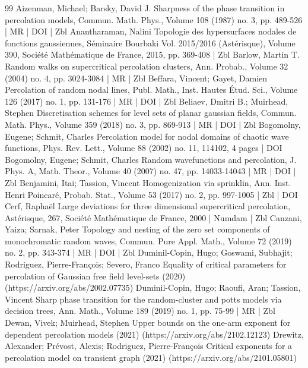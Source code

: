 \begin{thebibliography}{99}
Aizenman, Michael; Barsky, David J. Sharpness of the phase transition in percolation models, Commun. Math. Phys., Volume 108 (1987) no. 3, pp. 489-526 | MR | DOI | Zbl
Anantharaman, Nalini Topologie des hypersurfaces nodales de fonctions gaussiennes, Séminaire Bourbaki Vol. 2015/2016 (Astérisque), Volume 390, Société Mathématique de France, 2015, pp. 369-408 | Zbl
Barlow, Martin T. Random walks on supercritical percolation clusters, Ann. Probab., Volume 32 (2004) no. 4, pp. 3024-3084 | MR | Zbl
Beffara, Vincent; Gayet, Damien Percolation of random nodal lines, Publ. Math., Inst. Hautes Étud. Sci., Volume 126 (2017) no. 1, pp. 131-176 | MR | DOI | Zbl
Beliaev, Dmitri B.; Muirhead, Stephen Discretisation schemes for level sets of planar gaussian fields, Commun. Math. Phys., Volume 359 (2018) no. 3, pp. 869-913 | MR | DOI | Zbl
Bogomolny, Eugene; Schmit, Charles Percolation model for nodal domains of chaotic wave functions, Phys. Rev. Lett., Volume 88 (2002) no. 11, 114102, 4 pages | DOI
Bogomolny, Eugene; Schmit, Charles Random wavefunctions and percolation, J. Phys. A, Math. Theor., Volume 40 (2007) no. 47, pp. 14033-14043 | MR | DOI | Zbl
Benjamini, Itai; Tassion, Vincent Homogenization via sprinklin, Ann. Inst. Henri Poincaré, Probab. Stat., Volume 53 (2017) no. 2, pp. 997-1005 | Zbl | DOI
Cerf, Raphaël Large deviations for three dimensional supercritical percolation, Astérisque, 267, Société Mathématique de France, 2000 | Numdam | Zbl
Canzani, Yaiza; Sarnak, Peter Topology and nesting of the zero set components of monochromatic random waves, Commun. Pure Appl. Math., Volume 72 (2019) no. 2, pp. 343-374 | MR | DOI | Zbl
Duminil-Copin, Hugo; Goswami, Subhajit; Rodriguez, Pierre-François; Severo, Franco Equality of critical parameters for percolation of Gaussian free field level-sets (2020) (https://arxiv.org/abs/2002.07735)
Duminil-Copin, Hugo; Raoufi, Aran; Tassion, Vincent Sharp phase transition for the random-cluster and potts models via decision trees, Ann. Math., Volume 189 (2019) no. 1, pp. 75-99 | MR | Zbl
Dewan, Vivek; Muirhead, Stephen Upper bounds on the one-arm exponent for dependent percolation models (2021) (https://arxiv.org/abs/2102.12123)
Drewitz, Alexander; Prévost, Alexis; Rodriguez, Pierre-François Critical exponents for a percolation model on transient graph (2021) (https://arxiv.org/abs/2101.05801)

\end{thebibliography}
